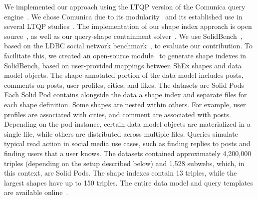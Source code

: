 We implemented our approach using the LTQP version of the Comunica query engine~\cite{taelman_iswc_resources_comunica_2018}.
We chose Comunica due to its modularity~\cite{taelman_swj_componentsjs_2022} and its established use in several LTQP studies~\cite{Bogaerts2021LinkTW, Taelman2023, eschauzier_quweda_linkqueue_2023, Hanski2024, eschauzier_amw_rcubemetric_2024, tam2024opportunitiesshapebasedoptimizationlink}.
The implementation of our shape index approach is open source~, as well as our query-shape containment solver~.
We use SolidBench~\cite{Taelman2023}, based on the LDBC social network benchmark~\cite{Angles2020}, to evaluate our contribution. 
To facilitate this, we created an open-source module~ to generate shape indexes in SolidBench, based on user-provided mappings between ShEx shapes and data model objects.
The shape-annotated portion of the data model includes posts, comments on posts, user profiles, cities, and likes.
The datasets are Solid Pods~\cite{dedecker2022s}
Each Solid Pod contains alongside the data a shape index and separate files for each shape definition.
Some shapes are nested within others. 
For example, user profiles are associated with cities, and comment are associated with posts.
Depending on the pod instance, certain data model objects are materialized in a single file, while others are distributed across multiple files.
Queries simulate typical read action in social media use cases, such as finding replies to posts and finding users that a user knows.
The datasets contained approximately 4,200,000 triples (depending on the setup described below) and 1,528 subwebs, which, in this context, are Solid Pods.
The shape indexes contain 13 triples, while the largest shapes have up to 150 triples.
The entire data model and query templates are available online~.


